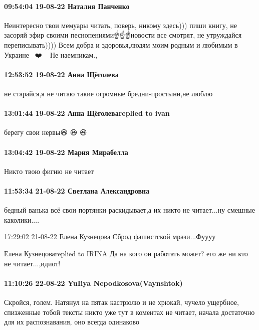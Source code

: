  
 
 
 
 

\paragraph{09:54:04 19-08-22 Наталия Панченко}

Неинтересно твои мемуары читать, поверь, никому здесь))) пиши книгу, не засоряй
эфир своими песнопениями☝️☝️☝️новости все смотрят, не утруждайся переписывать))))
Всем добра и здоровья,людям моим родным и любимым в Украине🥰🥰🥰❤️🤗🤗🤗 Не
наемникам.,

\paragraph{12:53:52 19-08-22 Анна Щёголева}

не старайся,я не читаю такие огромные бредни-простыни,не люблю

\paragraph{13:01:44 19-08-22 Анна Щёголеваreplied to ivan}

берегу свои нервы😆 😆 😆

\paragraph{13:04:42 19-08-22 Мария Мирабелла}

Никто твою фигню не читает🤣🤣🤣

\paragraph{11:53:34 21-08-22 Светлана Александровна}

бедный ванька всё свои портянки раскидывает,а их никто не читает...ну смешные
каколики....

17:29:02 21-08-22
Елена Кузнецова
Сброд фашистской мрази...Фуууу

Елена Кузнецоваreplied to IRINA
Да на кого он работать может? его же ни кто не читает...,идиот!

\paragraph{11:10:26 22-08-22 YuIiya Nepodkosova(Vaynshtok)}

Скройся, голем. Натянул на пятак кастрюлю и не хрюкай, чучело ущербное,
спизженные тобой тексты никто уже тут в коментах не читает, начала достаточно
для их распознавания, оно всегда одинаково
